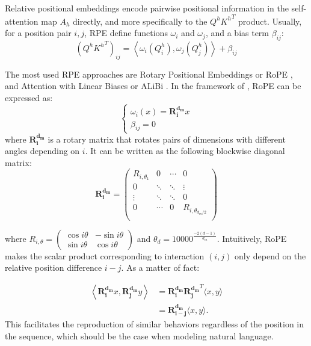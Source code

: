 Relative positional embeddings encode pairwise positional information in the self-attention map $A_h$ directly, and more specifically to the $Q^h {K^h}^T$ product. Usually, for a position pair $i, j$, RPE define functions $\omega_i$ and $\omega_j$, and a bias term $\beta_{ij}$:
\begin{equation}
    \label{eq:rpe}
\left(Q^h {K^h}^T\right)_{ij} = \left\langle \omega_i(Q^h_i), \omega_j(Q^h_j) \right\rangle + \beta_{ij}
\end{equation}

The most used RPE approaches are Rotary Positional Embeddings or RoPE \citep{rope}, and Attention with Linear Biases or ALiBi \citep{alibi}. In the framework of , RoPE can be expressed as:
$$
\begin{cases}
    \omega_i(x) = \mathbf{R^{d_m}_i}x \\
    \beta_{ij} = 0
\end{cases}
$$
where $\mathbf{R^{d_m}_i}$ is a rotary matrix that rotates pairs of dimensions with different angles depending on $i$. It can be written as the following blockwise diagonal matrix:
$$
\mathbf{R^{d_m}_i} = \begin{pmatrix}
    R_{i, \theta_1} & 0 & \cdots & 0 \\
    0 & \ddots & \ddots & \vdots \\
    \vdots & \ddots & \ddots & 0 \\
    0 & \cdots & 0 &  R_{i, \theta_{d_m/2}} \\
\end{pmatrix}
$$

where $R_{i, \theta} = \begin{pmatrix}
    \cos i \theta & -\sin i \theta \\
    \sin i \theta & \cos i \theta
\end{pmatrix}$ and $\theta_d = 10000^{\frac{-2(d-1)}{d_m}}$. Intuitively, RoPE makes the scalar product corresponding to interaction $(i, j)$ only depend on the relative position difference $i-j$. As a matter of fact:

\begin{align*}
    \left\langle \mathbf{R^{d_m}_i}x, \mathbf{R^{d_m}_j}y \right\rangle &= \mathbf{R^{d_m}_i} \mathbf{R^{d_m}_j}^T \langle x, y \rangle \\
    &= \mathbf{R^{d_m}_{i-j}} \langle x, y \rangle.
\end{align*}
This facilitates the reproduction of similar behaviors regardless of the position in the sequence, which should be the case when modeling natural language.

